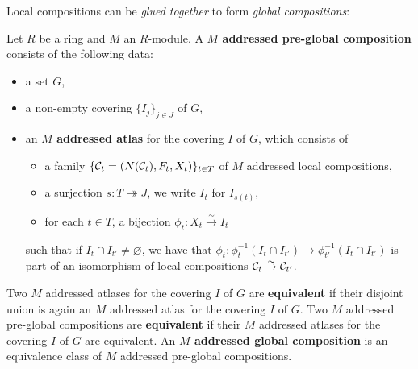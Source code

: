 Local compositions can be \emph{glued together} to form \emph{global compositions}:
\begin{defn}
 Let $R$ be a ring and $M$ an $R$-module. A \textbf{$M$ addressed pre-global composition} consists of the following data:
 \begin{itemize}
  \item a set $G$,
  \item a non-empty covering $\lbrace I_j \rbrace_{j \in J}$ of $G$,
  \item an \textbf{$M$ addressed atlas} for the covering $I$ of $G$, which consists of
  \begin{itemize}
   \item a family $\lbrace \mathcal{C}_t = (N(\mathcal{C}_t),F_t,X_t)\rbrace_{t \in T}$ of $M$ addressed local compositions,
   \item a surjection $s: T \twoheadrightarrow J$, we write $I_t$ for $I_{s(t)}$,
   \item for each $t \in T$, a bijection $\phi_t: X_t \stackrel{\sim}{\longrightarrow}I_t$
  \end{itemize}
such that if $I_t \cap I_{t'} \neq \varnothing$, we have that $\phi_t: \phi_t^{-1}(I_t \cap I_{t'}) \to \phi_{t'}^{-1}(I_t \cap I_{t'})$ is part of an isomorphism of local compositions $\mathcal{C}_t \stackrel{\sim}{\to}\mathcal{C}_{t'}$.
 \end{itemize}
Two $M$ addressed atlases for the covering $I$ of $G$ are \textbf{equivalent} if their disjoint union is again an $M$ addressed atlas for the covering $I$ of $G$. Two $M$ addressed pre-global compositions are \textbf{equivalent} if their $M$ addressed atlases for the covering $I$ of $G$ are equivalent. An \textbf{$M$ addressed global composition} is an equivalence class of $M$ addressed pre-global compositions.
\end{defn}
